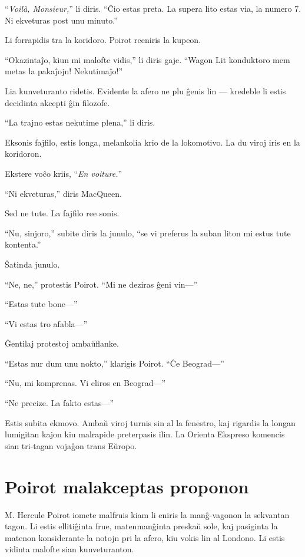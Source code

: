 ``\emph{Voilà, Monsieur,}'' li diris. ``Ĉio estas preta. La supera lito estas via, la numero 7. Ni ekveturas post unu minuto.''

Li forrapidis tra la koridoro. Poirot reeniris la kupeon.

``Okazintaĵo, kiun mi malofte vidis,'' li diris gaje. ``Wagon Lit konduktoro mem metas la pakaĵojn! Nekutimaĵo!''

Lia kunveturanto ridetis. Evidente la afero ne plu ĝenis lin --- kredeble li estis decidinta akcepti ĝin filozofe.

``La trajno estas nekutime plena,'' li diris.

Eksonis fajfilo, estis longa, melankolia krio de la lokomotivo. La du viroj iris en la koridoron.

Ekstere voĉo kriis, ``\emph{En voiture.}''

``Ni ekveturas,'' diris MacQueen.

Sed ne tute. La fajfilo ree sonis.

``Nu, sinjoro,'' subite diris la junulo, ``se vi preferus la suban liton mi estus tute kontenta.''

Ŝatinda junulo.

``Ne, ne,'' protestis Poirot. ``Mi ne deziras ĝeni vin---''

``Estas tute bone---''

``Vi estas tro afabla---''

Ĝentilaj protestoj ambaŭflanke.

``Estas nur dum unu nokto,'' klarigis Poirot. ``Ĉe Beograd---''

``Nu, mi komprenas. Vi eliros en Beograd---''

``Ne precize. La fakto estas---''

Estis subita ekmovo. Ambaŭ viroj turnis sin al la fenestro, kaj rigardis la longan lumigitan kajon kiu malrapide preterpasis ilin. La Orienta Ekspreso komencis sian tri-tagan vojaĝon trans Eŭropo.

\chapter[Poirot malakceptas proponon]{Poirot malakceptas proponon}


M. Hercule Poirot iomete malfruis kiam li eniris la manĝ-vagonon la sekvantan tagon. Li estis ellitiĝinta frue, matenmanĝinta preskaŭ sole, kaj pasiginta la matenon konsiderante la notojn pri la afero, kiu vokis lin al Londono. Li estis vidinta malofte sian kunveturanton.

